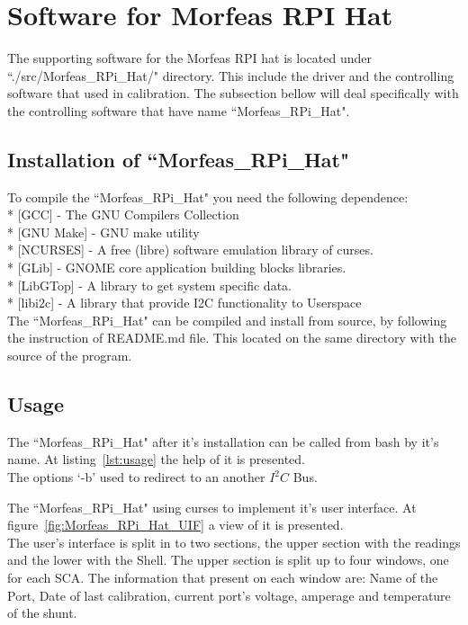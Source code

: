 \section{Software for Morfeas RPI Hat}
The supporting software for the Morfeas RPI hat is located under ``./src/Morfeas\_RPi\_Hat/" directory.
This include the driver and the controlling software that used in calibration.
The subsection bellow will deal specifically with the controlling software that have name ``Morfeas\_RPi\_Hat".

\subsection{Installation of ``Morfeas\_RPi\_Hat"}
To compile the ``Morfeas\_RPi\_Hat" you need the following dependence:\\
* [GCC] - The GNU Compilers Collection\\
* [GNU Make] - GNU make utility\\
* [NCURSES] - A free (libre) software emulation library of curses.\\
* [GLib] - GNOME core application building blocks libraries.\\
* [LibGTop] - A library to get system specific data.\\
* [libi2c] - A library that provide I2C functionality to Userspace\\

The ``Morfeas\_RPi\_Hat" can be compiled and install from source,
by following the instruction of README.md file. This located on the same directory with the source of the program.

\subsection{Usage}
The ``Morfeas\_RPi\_Hat" after it's installation can be called from bash by it's name. At listing~\ref{lst:usage} the help of it is presented.\\
The options `-b' used to redirect to an another $I^2C$ Bus.

The ``Morfeas\_RPi\_Hat" using curses to implement it's user interface. At figure~\ref{fig:Morfeas_RPi_Hat_UIF} a view of it is presented.\\
The user's interface is split in to two sections, the upper section with the readings and the lower with the Shell.
The upper section is split up to four windows, one for each SCA.
The information that present on each window are:
Name of the Port, Date of last calibration, current port's voltage, amperage and temperature of the shunt.\\


